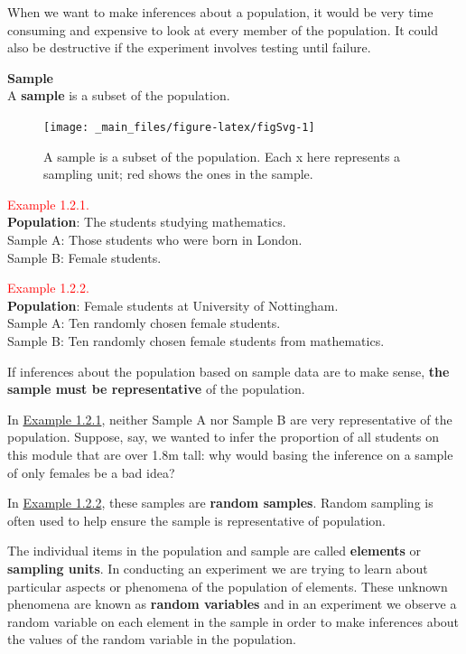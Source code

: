 \documentclass[
]{book}
\begin{document}
When we want to make inferences about a population, it would be very
time consuming and expensive to look at every member of the population. It could also be destructive if the experiment involves testing until failure.

\leavevmode{}%
{\textbf{Sample}}\\
A \textbf{sample} is a subset of the population.

\begin{figure}
\texttt{[image: \_main\_files/figure-latex/figSvg-1]} \caption{A sample is a subset of the population. Each x here represents a sampling unit; red shows the ones in the sample.}\label{fig:figSvg}
\end{figure}

\leavevmode{}%
\textcolor{red}{Example 1.2.1.}\\
\textbf{Population}: The students studying mathematics.\\
Sample A: Those students who were born in London.\\
Sample B: Female students.

\hfill\break

\leavevmode{}%
\textcolor{red}{Example 1.2.2.}\\
\textbf{Population}: Female students at University of Nottingham.\\
Sample A: Ten randomly chosen female students.\\
Sample B: Ten randomly chosen female students from mathematics.

If inferences about the population based on sample data are to
make sense, \textbf{the sample must be representative} of the
population.

In \protect\hyperlink{exm:example001}{Example 1.2.1}, neither Sample A nor
Sample B are very representative of the population.
Suppose, say, we wanted
to infer the proportion of all students on this module that
are over 1.8m tall: why would basing the inference on a sample of only
females be a bad idea?

In \protect\hyperlink{exm:example002}{Example 1.2.2}, these samples are \textbf{random samples}.
Random sampling is often used to help ensure the sample is representative
of population.

The individual items in the population and sample are called
\textbf{elements} or \textbf{sampling units}. In conducting an experiment we are
trying to learn about particular aspects or phenomena of the population
of elements. These unknown phenomena are known as \textbf{random variables}
and in an experiment we observe a random variable on each element
in the sample in order to make inferences about the values of the random variable
in the population.
\end{document}
